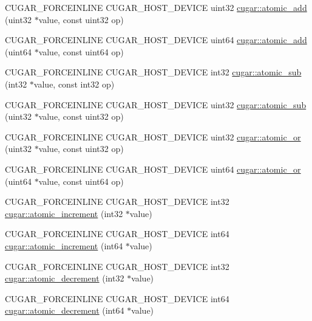 \begin{DoxyCompactItemize}
\item 
C\+U\+G\+A\+R\+\_\+\+F\+O\+R\+C\+E\+I\+N\+L\+I\+NE C\+U\+G\+A\+R\+\_\+\+H\+O\+S\+T\+\_\+\+D\+E\+V\+I\+CE uint32 \hyperlink{group___atomics_ga130aea0c6d0c91af08bea4b52d6a8208}{cugar\+::atomic\+\_\+add} (uint32 $\ast$value, const uint32 op)
\item 
C\+U\+G\+A\+R\+\_\+\+F\+O\+R\+C\+E\+I\+N\+L\+I\+NE C\+U\+G\+A\+R\+\_\+\+H\+O\+S\+T\+\_\+\+D\+E\+V\+I\+CE uint64 \hyperlink{group___atomics_gaed434d4f310d826a6e39932269de15c4}{cugar\+::atomic\+\_\+add} (uint64 $\ast$value, const uint64 op)
\item 
C\+U\+G\+A\+R\+\_\+\+F\+O\+R\+C\+E\+I\+N\+L\+I\+NE C\+U\+G\+A\+R\+\_\+\+H\+O\+S\+T\+\_\+\+D\+E\+V\+I\+CE int32 \hyperlink{group___atomics_ga3efc1d5c63f30d1ee11887f76744bafe}{cugar\+::atomic\+\_\+sub} (int32 $\ast$value, const int32 op)
\item 
C\+U\+G\+A\+R\+\_\+\+F\+O\+R\+C\+E\+I\+N\+L\+I\+NE C\+U\+G\+A\+R\+\_\+\+H\+O\+S\+T\+\_\+\+D\+E\+V\+I\+CE uint32 \hyperlink{group___atomics_ga9d9415fae4e05362c8d6f43d2fd61c60}{cugar\+::atomic\+\_\+sub} (uint32 $\ast$value, const uint32 op)
\item 
C\+U\+G\+A\+R\+\_\+\+F\+O\+R\+C\+E\+I\+N\+L\+I\+NE C\+U\+G\+A\+R\+\_\+\+H\+O\+S\+T\+\_\+\+D\+E\+V\+I\+CE uint32 \hyperlink{group___atomics_ga4b242819dd9c2a9986e0ea35b4883f67}{cugar\+::atomic\+\_\+or} (uint32 $\ast$value, const uint32 op)
\item 
C\+U\+G\+A\+R\+\_\+\+F\+O\+R\+C\+E\+I\+N\+L\+I\+NE C\+U\+G\+A\+R\+\_\+\+H\+O\+S\+T\+\_\+\+D\+E\+V\+I\+CE uint64 \hyperlink{group___atomics_ga5d15edb3c64f3cde839eb76c54aacf7c}{cugar\+::atomic\+\_\+or} (uint64 $\ast$value, const uint64 op)
\item 
C\+U\+G\+A\+R\+\_\+\+F\+O\+R\+C\+E\+I\+N\+L\+I\+NE C\+U\+G\+A\+R\+\_\+\+H\+O\+S\+T\+\_\+\+D\+E\+V\+I\+CE int32 \hyperlink{group___atomics_ga3034bbde9594dc3c4894fe31ad5a0b3c}{cugar\+::atomic\+\_\+increment} (int32 $\ast$value)
\item 
C\+U\+G\+A\+R\+\_\+\+F\+O\+R\+C\+E\+I\+N\+L\+I\+NE C\+U\+G\+A\+R\+\_\+\+H\+O\+S\+T\+\_\+\+D\+E\+V\+I\+CE int64 \hyperlink{group___atomics_ga57595e5240e01e562a47816a82e14dd2}{cugar\+::atomic\+\_\+increment} (int64 $\ast$value)
\item 
C\+U\+G\+A\+R\+\_\+\+F\+O\+R\+C\+E\+I\+N\+L\+I\+NE C\+U\+G\+A\+R\+\_\+\+H\+O\+S\+T\+\_\+\+D\+E\+V\+I\+CE int32 \hyperlink{group___atomics_ga60cd477d17c1ff78aa673ce06b60b569}{cugar\+::atomic\+\_\+decrement} (int32 $\ast$value)
\item 
C\+U\+G\+A\+R\+\_\+\+F\+O\+R\+C\+E\+I\+N\+L\+I\+NE C\+U\+G\+A\+R\+\_\+\+H\+O\+S\+T\+\_\+\+D\+E\+V\+I\+CE int64 \hyperlink{group___atomics_gae94ecfb92e8d261326f527daa39c770d}{cugar\+::atomic\+\_\+decrement} (int64 $\ast$value)
\end{DoxyCompactItemize}


